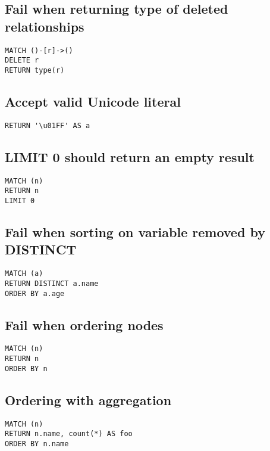 \subsection{Fail when returning type of deleted relationships}

\begin{lstlisting}
MATCH ()-[r]->()
DELETE r
RETURN type(r)
\end{lstlisting}

\subsection{Accept valid Unicode literal}

\begin{lstlisting}
RETURN '\u01FF' AS a
\end{lstlisting}

\subsection{LIMIT 0 should return an empty result}

\begin{lstlisting}
MATCH (n)
RETURN n
LIMIT 0
\end{lstlisting}

\subsection{Fail when sorting on variable removed by DISTINCT}

\begin{lstlisting}
MATCH (a)
RETURN DISTINCT a.name
ORDER BY a.age
\end{lstlisting}

\subsection{Fail when ordering nodes}

\begin{lstlisting}
MATCH (n)
RETURN n
ORDER BY n
\end{lstlisting}

\subsection{Ordering with aggregation}

\begin{lstlisting}
MATCH (n)
RETURN n.name, count(*) AS foo
ORDER BY n.name
\end{lstlisting}

